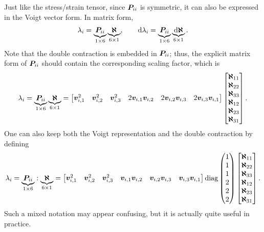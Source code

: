 Just like the stress/strain tensor, since $\bm{P}_{ii}$ is symmetric, it can also be expressed in the Voigt vector form.
In matrix form,
\begin{gather}
    \lambda_i=\underbrace{\bm{P}_{ii}}_{1\times6}\underbrace{\bm{\aleph}}_{6\times1},\qquad
    \mathrm{d}\lambda_i=\underbrace{\bm{P}_{ii}}_{1\times6}\underbrace{\mathrm{d}\bm{\aleph}}_{6\times1}.
\end{gather}
Note that the double contraction is embedded in $\bm{P}_{ii}$; thus, the explicit matrix form of $\bm{P}_{ii}$ should contain the corresponding scaling factor, which is
\begin{gather}
    \lambda_i=\underbrace{\bm{P}_{ii}}_{1\times6}\underbrace{\bm{\aleph}}_{6\times1}=\begin{bmatrix}
        \bm{v}_{i,1}^2 & \bm{v}_{i,2}^2 & \bm{v}_{i,3}^2 & 2\bm{v}_{i,1}\bm{v}_{i,2} & 2\bm{v}_{i,2}\bm{v}_{i,3} & 2\bm{v}_{i,3}\bm{v}_{i,1}
    \end{bmatrix}\begin{bmatrix}
        \bm{\aleph}_{11} \\\bm{\aleph}_{22}\\\bm{\aleph}_{33}\\\bm{\aleph}_{12}\\\bm{\aleph}_{23}\\\bm{\aleph}_{31}
    \end{bmatrix}.
\end{gather}
One can also keep both the Voigt representation and the double contraction by defining
\begin{gather}
    \lambda_i=\underbrace{\bm{P}_{ii}}_{1\times6}:\underbrace{\bm{\aleph}}_{6\times1}=\begin{bmatrix}
        \bm{v}_{i,1}^2 & \bm{v}_{i,2}^2 & \bm{v}_{i,3}^2 & \bm{v}_{i,1}\bm{v}_{i,2} & \bm{v}_{i,2}\bm{v}_{i,3} & \bm{v}_{i,3}\bm{v}_{i,1}
    \end{bmatrix}\text{diag}\left(\begin{matrix}1\\1\\1\\2\\2\\2\end{matrix}\right)\begin{bmatrix}
        \bm{\aleph}_{11} \\\bm{\aleph}_{22}\\\bm{\aleph}_{33}\\\bm{\aleph}_{12}\\\bm{\aleph}_{23}\\\bm{\aleph}_{31}
    \end{bmatrix}.
\end{gather}
Such a mixed notation may appear confusing, but it is actually quite useful in practice.


